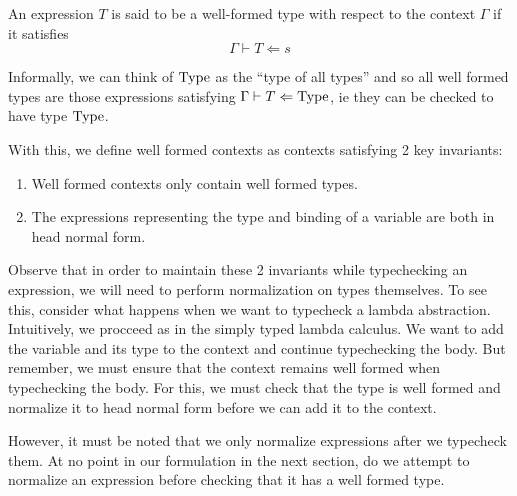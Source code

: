 \documentclass{article}
\begin{document}
\begin{definition} 
  An expression $T$ is said to be a well-formed type with respect to the context
  $\Gamma$ if it satisfies
  \[ \Gamma \vdash T \Leftarrow s \]

  Informally, we can think of $\operatorname{Type}$ as the ``type of all types'' and so
  all well formed types are those expressions satisfying
  $\Gamma \vdash T \Leftarrow \operatorname{Type}$, ie they can be checked to have type $\operatorname{Type}$.

\end{definition}

With this, we define well formed contexts as contexts satisfying 2 key invariants:
\begin{enumerate}
  \item Well formed contexts only contain well formed types.
  \item The expressions representing the type and binding of a variable are both
  in head normal form.
\end{enumerate}

Observe that in order to maintain these 2 invariants while typechecking
an expression,  we will need to perform normalization on types themselves.
To see this, consider what happens when we want to typecheck a lambda abstraction.
Intuitively, we procceed as in the simply typed lambda calculus. We want to add
the variable and its type to the context and continue typechecking the body.
But remember, we must ensure that the context remains well formed when
typechecking the body. For this, we must check that the type is well formed and
normalize it to head normal form before we can add it to the context.

However, it must be noted that we only normalize expressions after we typecheck
them. At no point in our formulation in the next section, do we attempt to
normalize an expression before checking that it has a well formed type.
\end{document}
